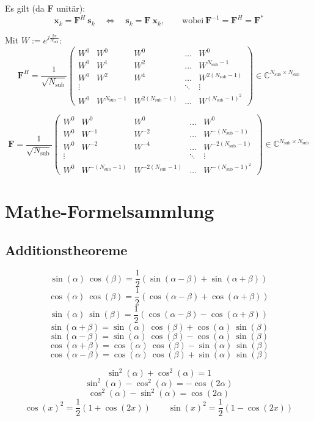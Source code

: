 \documentclass[a4paper, 11pt]{article}
\begin{document}
Es gilt (da $\mathbf F$ unitär):
\[
	\mathbf x_k = \mathbf F^H ~ \mathbf s_k \quad \Leftrightarrow \quad \mathbf s_k = \mathbf F ~ \mathbf x_k, \qquad \text{wobei} ~ \mathbf F^{-1} = \mathbf F^H = \mathbf F^*
\]

Mit $W := e^{j \frac{2 \pi}{N_{\mathrm{sub}}}}$:
\[
	\mathbf F^H = \frac{1}{\sqrt{N_\mathrm{sub}}} \begin{pmatrix}
		W^0 & W^0 & W^0 & \ldots & W^0 \\
		W^0 & W^1 & W^2 & \ldots & W^{N_\mathrm{sub} - 1} \\
		W^0 & W^2 & W^4 & \ldots & W^{2 (N_\mathrm{sub} - 1)} \\
		\vdots & & & \ddots & \vdots \\
		W^0 & W^{N_\mathrm{sub} - 1} & W^{2(N_\mathrm{sub} - 1)} & \ldots & W^{(N_\mathrm{sub} - 1)^2}
	\end{pmatrix} \in \mathbb C^{N_\mathrm{sub} \times N_\mathrm{sub}}
\]

\[
	\mathbf F = \frac{1}{\sqrt{N_\mathrm{sub}}} \begin{pmatrix}
		W^0 & W^0 & W^0 & \ldots & W^0 \\
		W^0 & W^{-1} & W^{-2} & \ldots & W^{-(N_\mathrm{sub} - 1)} \\
		W^0 & W^{-2} & W^{-4} & \ldots & W^{-2 (N_\mathrm{sub} - 1)} \\
		\vdots & & & \ddots & \vdots \\
		W^0 & W^{-(N_\mathrm{sub} - 1)} & W^{-2(N_\mathrm{sub} - 1)} & \ldots & W^{-(N_\mathrm{sub} - 1)^2}
	\end{pmatrix} \in \mathbb C^{N_\mathrm{sub} \times N_\mathrm{sub}}
\]

\section*{Mathe-Formelsammlung}
\subsection*{Additionstheoreme}
\begin{multicols}{2}
\[ \sin(\alpha) ~ \cos(\beta) = \frac{1}{2} (\sin(\alpha - \beta) + \sin(\alpha + \beta)) \]
\[ \cos(\alpha) ~ \cos(\beta) = \frac{1}{2} (\cos(\alpha - \beta) + \cos(\alpha + \beta)) \]
\[ \sin(\alpha) ~ \sin(\beta) = \frac{1}{2} (\cos(\alpha - \beta) - \cos(\alpha + \beta)) \]
\vspace{0.5pt}
\[ \sin(\alpha + \beta) = \sin(\alpha) ~ \cos(\beta) + \cos(\alpha) ~ \sin(\beta) \]
\[ \sin(\alpha - \beta) = \sin(\alpha) ~ \cos(\beta) - \cos(\alpha) ~ \sin(\beta) \]
\[ \cos(\alpha + \beta) = \cos(\alpha) ~ \cos(\beta) - \sin(\alpha) ~ \sin(\beta) \]
\[ \cos(\alpha - \beta) = \cos(\alpha) ~ \cos(\beta) + \sin(\alpha) ~ \sin(\beta) \]
\end{multicols}
\vspace{0.5pt}
\[ \sin^2(\alpha) + \cos^2(\alpha) = 1 \]
\[ \sin^2(\alpha) - \cos^2(\alpha) = -\cos(2\alpha) \]
\[ \cos^2(\alpha) - \sin^2(\alpha) = \cos(2\alpha) \]
\[ \cos(x)^2 = \frac{1}{2} \left(1 + \cos(2x) \right) \qquad \sin(x)^2 = \frac{1}{2} \left(1 - \cos(2x) \right) \]
\end{document}
